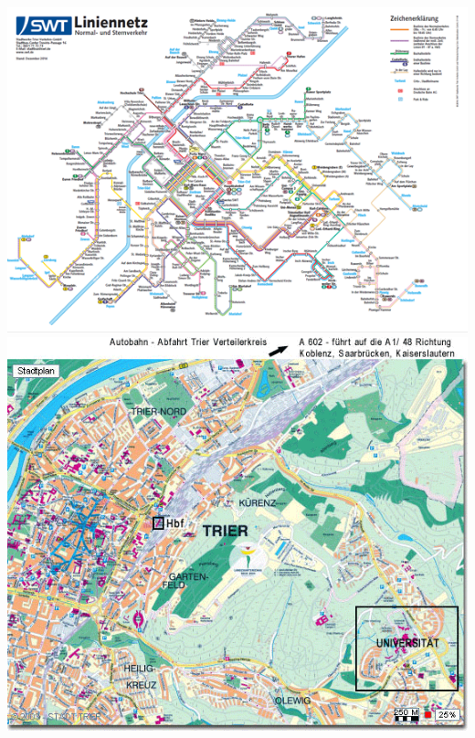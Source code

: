 
\begin{frame}
	
	\begin{columns}
			\includegraphics{./pictures/liniennetz.png}
			\includegraphics{./pictures/stadtplan_02.gif}
	\end{columns}
\end{frame}


